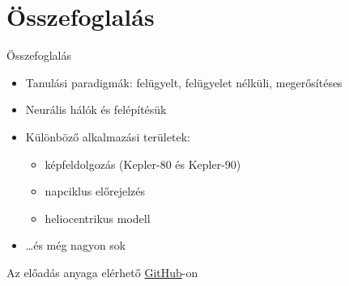 \section{Összefoglalás}

\begin{frame}{Összefoglalás}
    \begin{itemize}
        \item Tanulási paradigmák: felügyelt, felügyelet nélküli, megerősítéses
        \item Neurális hálók és felépítésük
        \item Különböző alkalmazási területek:
        \begin{itemize}
            \item képfeldolgozás (Kepler-80 és Kepler-90)
            \item napciklus előrejelzés
            \item heliocentrikus modell
        \end{itemize}
        \item \dots és még nagyon sok
    \end{itemize}
    
    \vfill
    
    Az előadás anyaga elérhető \href{https://github.com/ohanyecz/mi-a-csillagaszatban}{GitHub}-on
\end{frame}